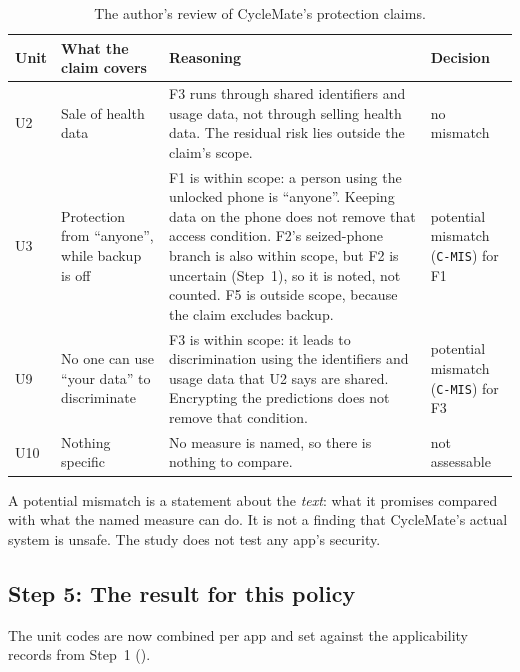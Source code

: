 \begin{table}[H]
\centering
\caption{The author's review of CycleMate's protection claims.}
\label{tab:we-mismatch}
\small
\begin{tabularx}{\textwidth}{@{}l>{\raggedright\arraybackslash}p{3.4cm}
                                   >{\raggedright\arraybackslash}X
                                   >{\raggedright\arraybackslash}p{2.3cm}@{}}
\toprule
\textbf{Unit} & \textbf{What the claim covers} & \textbf{Reasoning} &
  \textbf{Decision} \\
\midrule
U2 & Sale of health data
   & F3 runs through shared identifiers and usage data, not through selling
     health data. The residual risk lies outside the claim's scope.
   & no mismatch \\
\addlinespace
U3 & Protection from \enquote{anyone}, while backup is off
   & F1 is within scope: a person using the unlocked phone is
     \enquote{anyone}. Keeping data on the phone does not remove that access
     condition. F2's seized-phone branch is also within scope, but F2 is
     uncertain (Step~1), so it is noted, not counted. F5 is outside scope,
     because the claim excludes backup.
   & potential mismatch (\texttt{C-MIS}) for F1 \\
\addlinespace
U9 & No one can use \enquote{your data} to discriminate
   & F3 is within scope: it leads to discrimination using the identifiers and
     usage data that U2 says are shared. Encrypting the predictions does not
     remove that condition.
   & potential mismatch (\texttt{C-MIS}) for F3 \\
\addlinespace
U10 & Nothing specific & No measure is named, so there is nothing to compare.
   & not assessable \\
\bottomrule
\end{tabularx}
\end{table}

\noindent A potential mismatch is a statement about the \emph{text}: what it
promises compared with what the named measure can do. It is not a finding
that CycleMate's actual system is unsafe. The study does not test any app's
security.

\subsection*{Step 5: The result for this policy}

The unit codes are now combined per app and set against the applicability
records from Step~1 ().

